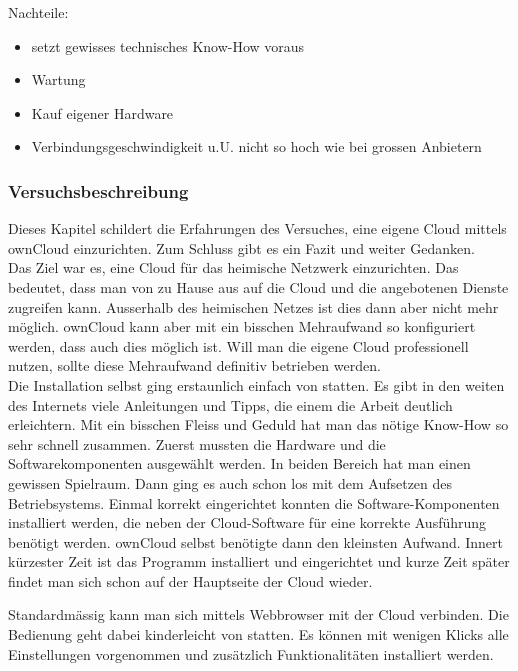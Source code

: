 Nachteile:
\begin{itemize}
\item setzt gewisses technisches Know-How voraus
\item Wartung
\item Kauf eigener Hardware
\item Verbindungsgeschwindigkeit u.U. nicht so hoch wie bei grossen Anbietern
\end{itemize}

\subsubsection{Versuchsbeschreibung}
Dieses Kapitel schildert die Erfahrungen des Versuches, eine eigene Cloud mittels ownCloud einzurichten. Zum Schluss gibt es ein Fazit und weiter Gedanken.
\\
Das Ziel war es, eine Cloud für das heimische Netzwerk einzurichten. Das bedeutet, dass man von zu Hause aus auf die Cloud und die angebotenen Dienste zugreifen kann. Ausserhalb des heimischen Netzes ist dies dann aber nicht mehr möglich. ownCloud kann aber mit ein bisschen Mehraufwand so konfiguriert werden, dass auch dies möglich ist. Will man die eigene Cloud professionell nutzen, sollte diese Mehraufwand definitiv betrieben werden.
\\
Die Installation selbst ging erstaunlich einfach von statten. Es gibt in den weiten des Internets viele Anleitungen und Tipps, die einem die Arbeit deutlich erleichtern. Mit ein bisschen Fleiss und Geduld hat man das nötige Know-How so sehr schnell zusammen. Zuerst mussten die Hardware und die Softwarekomponenten ausgewählt werden. In beiden Bereich hat man einen gewissen Spielraum. Dann ging es auch schon los mit dem Aufsetzen des Betriebsystems. Einmal korrekt eingerichtet konnten die Software-Komponenten installiert werden, die neben der Cloud-Software für eine korrekte Ausführung benötigt werden. ownCloud selbst benötigte dann den kleinsten Aufwand. Innert kürzester Zeit ist das Programm installiert und eingerichtet und kurze Zeit später findet man sich schon auf der Hauptseite der Cloud wieder.

Standardmässig kann man sich mittels Webbrowser mit der Cloud verbinden. Die Bedienung geht dabei kinderleicht von statten. Es können mit wenigen Klicks alle Einstellungen vorgenommen und zusätzlich Funktionalitäten installiert werden. 


